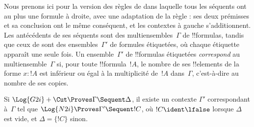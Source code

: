 \documentclass[../../../include/open-logic-section]{subfiles}
\begin{document}


Nous prenons ici pour  la version des règles
de  dans laquelle tous les séquents ont au plus
une formule à droite, avec une adaptation de la règle
\LeftR{\lor} : ses deux prémisses et sa conclusion ont
le même conséquent, et les contextes à gauche s'additionnent.
Les antécédents de ses séquents
sont des multiensembles~$\Gamma$ de !!{formula}s, tandis
que ceux de  sont des ensembles~$\Gamma'$ de
formules étiquetées, où chaque étiquette apparaît une
seule fois. Un ensemble~$\Gamma'$ de !!{formula}s
étiquetées \emph{correspond} au multiensemble~$\Gamma$
si, pour toute !!{formula}~$!A$, le nombre de ses
!!{element}s de la forme $x : !A$ est inférieur ou égal
à la multiplicité de~$!A$ dans~$\Gamma$, c'est-à-dire
au nombre de ses copies.

\begin{prop}
Si $\Log{G2i} + \Cut \Proves \Gamma \Sequent \Delta$,
il existe un contexte $\Gamma'$ correspondant à~$\Gamma$
tel que $\Log{N2i} \Proves \Gamma' \Sequent !C$,
où $!C \ident \lfalse$ lorsque $\Delta$ est vide,
et $\Delta = \{!C\}$ sinon.
\end{prop}
\end{document}

